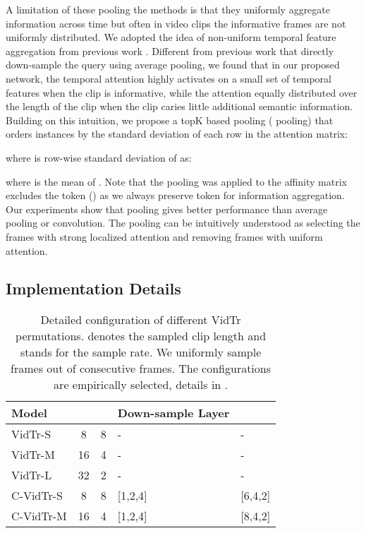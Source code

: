 \documentclass[10pt,twocolumn,letterpaper]{article}
\begin{document}
A limitation of these pooling the methods is that they uniformly aggregate information across time but often in video clips the informative frames are not uniformly distributed. We adopted the idea of non-uniform temporal feature aggregation from previous work \cite{li2020nuta}.
Different from previous work \cite{li2020nuta} that directly down-sample the query using average pooling, we found that in our proposed network, the temporal attention highly activates on a small set of temporal features when the clip is informative, while the attention equally distributed over the length of the clip when the clip caries little additional semantic information.
Building on this intuition, we propose a topK based pooling ( pooling) that orders instances by the standard deviation of each row in the attention matrix: 

where  is row-wise standard deviation of  as:

where  is the mean of . Note that the  pooling was applied to the affinity matrix excludes the token () as we always preserve token for information aggregation. 
Our experiments show that  pooling gives better performance than average pooling or convolution. The  pooling can be intuitively understood as  selecting the frames with strong localized attention and removing frames with uniform attention. 

 
\subsection{Implementation Details} 
\begin{table}[t!]
    \footnotesize
	\begin{center}
		\begin{tabularx}{1\columnwidth}{l|c|c|l|l} 
		    \toprule
			Model        &  &  & Down-sample Layer &      \\ 
			\midrule
			VidTr-S        & 8 & 8 & - & -  \\
			VidTr-M        & 16 & 4 & - & -  \\
			VidTr-L        & 32 & 2 & - & -   \\
			C-VidTr-S      & 8 & 8 & [1,2,4] & [6,4,2]   \\
			C-VidTr-M      & 16 & 4 & [1,2,4] & [8,4,2] \\
			\bottomrule
		\end{tabularx}
	\end{center}
	\caption{Detailed configuration of different VidTr permutations.  denotes the sampled clip length and  stands for the sample rate. We uniformly sample  frames out of  consecutive frames. The configurations are empirically selected, details in .}
	\label{tab:permutation}
\end{table}
\end{document}
